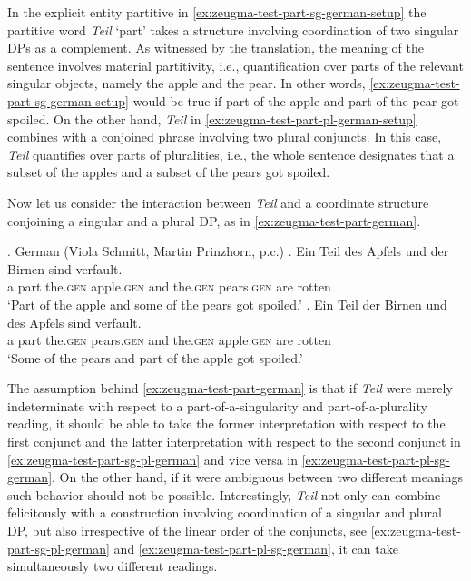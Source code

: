 In the explicit entity partitive in \ref{ex:zeugma-test-part-sg-german-setup} the partitive word \textit{Teil} `part' takes a structure involving coordination of two singular DPs as a complement. As witnessed by the translation, the meaning of the sentence involves material partitivity, i.e., quantification over parts of the relevant singular objects, namely the apple and the pear. In other words, \ref{ex:zeugma-test-part-sg-german-setup} would be true if part of the apple and part of the pear got spoiled. On the other hand, \textit{Teil} in \ref{ex:zeugma-test-part-pl-german-setup} combines with a conjoined phrase involving two plural conjuncts. In this case, \textit{Teil} quantifies over parts of pluralities, i.e., the whole sentence designates that a subset of the apples and a subset of the pears got spoiled.

Now let us consider the interaction between \textit{Teil} and a coordinate structure conjoining a singular and a plural DP, as in \ref{ex:zeugma-test-part-german}. 

\ex.\label{ex:zeugma-test-part-german} German (Viola Schmitt, Martin Prinzhorn, p.c.)
\ag. Ein Teil des Apfels und der Birnen sind verfault.\label{ex:zeugma-test-part-sg-pl-german}\\
a part the\textsc{.gen} apple\textsc{.gen} and the\textsc{.gen} pears\textsc{.gen} are rotten\\
`Part of the apple and some of the pears got spoiled.'
\bg. Ein Teil der Birnen und des Apfels sind verfault.\label{ex:zeugma-test-part-pl-sg-german}\\
a part the\textsc{.gen} pears\textsc{.gen} and the\textsc{.gen} apple\textsc{.gen} are rotten\\
`Some of the pears and part of the apple got spoiled.'

The assumption behind \ref{ex:zeugma-test-part-german} is that if \textit{Teil} were merely indeterminate with respect to a part-of-a-singularity and part-of-a-plurality reading, it should be able to take the former interpretation with respect to the first conjunct and the latter interpretation with respect to the second conjunct in \ref{ex:zeugma-test-part-sg-pl-german} and vice versa in \ref{ex:zeugma-test-part-pl-sg-german}. On the other hand, if it were ambiguous between two different meanings such behavior should not be possible. Interestingly, \textit{Teil} not only can combine felicitously with a construction involving coordination of a singular and plural DP, but also irrespective of the linear order of the conjuncts, see \ref{ex:zeugma-test-part-sg-pl-german} and \ref{ex:zeugma-test-part-pl-sg-german}, it can take simultaneously two different readings.

